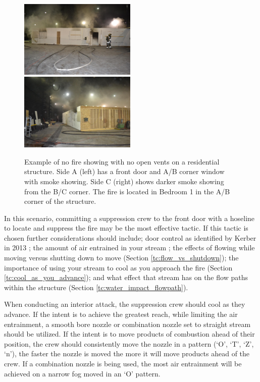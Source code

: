 \documentclass[12pt,oneside]{book}
\begin{document}
\begin{figure}[H]
\centering
\includegraphics[width=0.495\textwidth]{../0_Images/Tactical_Considerations/Interior_Attack/SIDE_A.jpg}
\includegraphics[width=0.495\textwidth]{../0_Images/Tactical_Considerations/Interior_Attack/SIDE_C.jpg}
\caption[Example - Smoke Showing - No Fire Showing]{Example of no fire showing with no open vents on a residential structure. Side A (left) has a front door and A/B corner window with smoke showing. Side C (right) shows darker smoke showing from the B/C corner. The fire is located in Bedroom 1 in the A/B corner of the structure.}
\label{fig:interior_attack_TC_smoke_showing}
\end{figure}

In this scenario, committing a suppression crew to the front door with a hoseline to locate and suppress the fire may be the most effective tactic. If this tactic is chosen further considerations should include; door control as identified by Kerber in 2013 \cite{UL_VerticalVent}; the amount of air entrained in your stream \cite{Weinchenk_airentrainment}; the effects of flowing while moving versus shutting down to move (Section \ref{tc:flow_vs_shutdown}); the importance of using your stream to cool as you approach the fire (Section \ref{tc:cool_as_you_advance}); and what effect that stream has on the flow paths within the structure (Section \ref{tc:water_impact_flowpath}).

When conducting an interior attack, the suppression crew should cool as they advance. If the intent is to achieve the greatest reach, while limiting the air entrainment, a smooth bore nozzle or combination nozzle set to straight stream should be utilized.  If the intent is to move products of combustion ahead of their position, the crew should consistently move the nozzle in a pattern (`O', `T', `Z', `n'), the faster the nozzle is moved the more it will move products ahead of the crew. If a combination nozzle is being used, the most air entrainment will be achieved on a narrow fog moved in an `O' pattern. 
\end{document}
